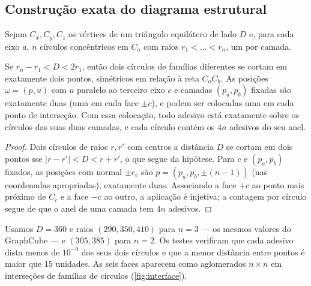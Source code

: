 \subsection{Construção exata do diagrama estrutural}\label{sec:estrutural}
Sejam $C_x, C_y, C_z$ os vértices de um triângulo equilátero de lado $D$ e, para cada eixo $a$, $n$ círculos concêntricos em $C_a$ com raios $r_1<\dots<r_n$, um por camada.
\begin{proposition}\label{prop:estrutural}\proj
Se $r_n-r_1<D<2r_1$, então dois círculos de famílias diferentes se cortam em exatamente dois pontos, simétricos em relação à reta $C_aC_b$. As posições $\omega=(p,u)$ com $u$ paralelo ao terceiro eixo $c$ e camadas $(p_a,p_b)$ fixadas são exatamente duas (uma em cada face $\pm c$), e podem ser colocadas uma em cada ponto de interseção. Com essa colocação, todo adesivo está exatamente sobre os círculos das suas duas camadas, e cada círculo contém os $4n$ adesivos do seu anel.
\end{proposition}
\begin{proof}
Dois círculos de raios $r,r'$ com centros a distância $D$ se cortam em dois pontos sse $|r-r'|<D<r+r'$, o que segue da hipótese. Para $c$ e $(p_a,p_b)$ fixados, as posições com normal $\pm e_c$ são $p=(p_a,p_b,\pm(n-1))$ (nas coordenadas apropriadas), exatamente duas. Associando a face $+c$ ao ponto mais próximo de $C_c$ e a face $-c$ ao outro, a aplicação é injetiva; a contagem por círculo segue de que o anel de uma camada tem $4n$ adesivos.
\end{proof}
\noindent Usamos $D=360$ e raios $(290,350,410)$ para $n=3$ --- os mesmos valores do GraphCube --- e $(305,385)$ para $n=2$. Os testes verificam que cada adesivo dista menos de $10^{-9}$ dos seus dois círculos e que a menor distância entre pontos é maior que 15 unidades. As seis faces aparecem como aglomerados $n\times n$ em interseções de famílias de círculos (\cref{fig:interface}).

